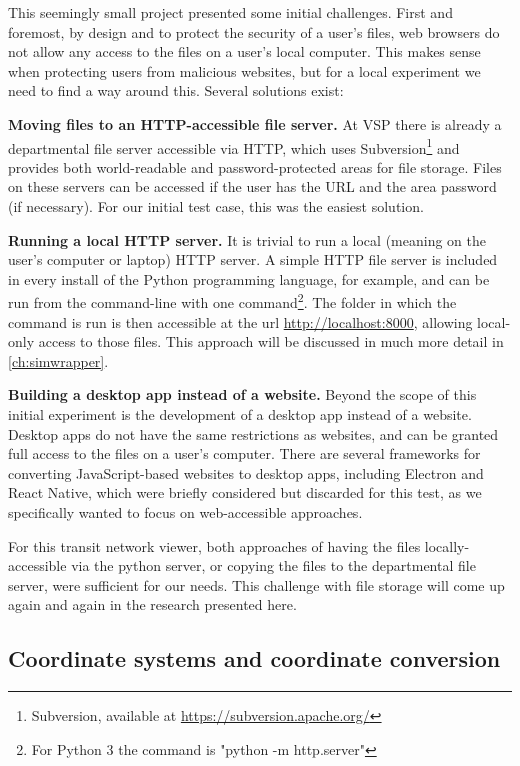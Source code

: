 This seemingly small project presented some initial challenges. First and foremost, by design and to protect the security of a user's files, web browsers do not allow any access to the files on a user's local computer. This makes sense when protecting users from malicious websites, but for a local experiment we need to find a way around this. Several solutions exist:

\textbf{Moving files to an HTTP-accessible file server.} At VSP there is already a departmental file server accessible via HTTP, which uses Subversion\footnote{Subversion, available at \url{https://subversion.apache.org/}} and provides both world-readable and password-protected areas for file storage. Files on these servers can be accessed if the user has the URL and the area password (if necessary). For our initial test case, this was the easiest solution.

\textbf{Running a local HTTP server.} It is trivial to run a local (meaning on the user's computer or laptop) HTTP server. A simple HTTP file server is included in every install of the Python programming language, for example, and can be run from the command-line with one command\footnote{For Python 3 the command is "python -m http.server"}. The folder in which the command is run is then accessible at the url \url{http://localhost:8000}, allowing local-only access to those files. This approach will be discussed in much more detail in \autoref{ch:simwrapper}.

\textbf{Building a desktop app instead of a website.} Beyond the scope of this initial experiment is the development of a desktop app instead of a website. Desktop apps do not have the same restrictions as websites, and can be granted full access to the files on a user's computer. There are several frameworks for converting JavaScript-based websites to desktop apps, including Electron and React Native, which were briefly considered but discarded for this test, as we specifically wanted to focus on web-accessible approaches.

For this transit network viewer, both approaches of having the files locally-accessible via the python server, or copying the files to the departmental file server, were sufficient for our needs. This challenge with file storage will come up again and again in the research presented here.

\hypertarget{server-experiments-coords}{%
\subsection{Coordinate systems and coordinate conversion}
\label{server-experiments-coords}}

